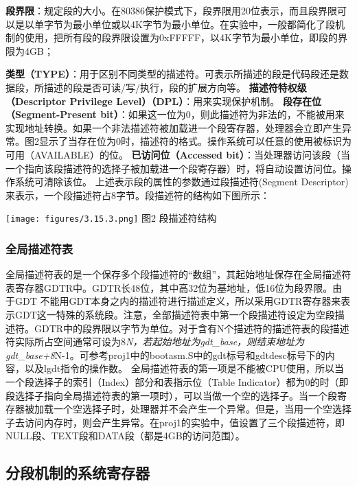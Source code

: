 \textbf{段界限}：规定段的大小。在80386保护模式下，段界限用20位表示，而且段界限可以是以单字节为最小单位或以4K字节为最小单位。在实验中，一般都简化了段机制的使用，把所有段的段界限设置为0xFFFFF，以4K字节为最小单位，即段的界限为4GB；

\textbf{类型（TYPE）}：用于区别不同类型的描述符。可表示所描述的段是代码段还是数据段，所描述的段是否可读/写/执行，段的扩展方向等。
\textbf{描述符特权级（Descriptor Privilege
Level）（DPL）}：用来实现保护机制。 \textbf{段存在位（Segment-Present
bit）}：如果这一位为0，则此描述符为非法的，不能被用来实现地址转换。如果一个非法描述符被加载进一个段寄存器，处理器会立即产生异常。图2显示了当存在位为0时，描述符的格式。操作系统可以任意的使用被标识为可用（AVAILABLE）的位。
\textbf{已访问位（Accessed
bit）}：当处理器访问该段（当一个指向该段描述符的选择子被加载进一个段寄存器）时，将自动设置访问位。操作系统可清除该位。
上述表示段的属性的参数通过段描述符(Segment
Descriptor)来表示，一个段描述符占8字节。段描述符的结构如下图所示：

\texttt{[image: figures/3.15.3.png]} 图2 段描述符结构

\subsubsection{全局描述符表}\label{ux5168ux5c40ux63cfux8ff0ux7b26ux8868}

全局描述符表的是一个保存多个段描述符的``数组''，其起始地址保存在全局描述符表寄存器GDTR中。GDTR长48位，其中高32位为基地址，低16位为段界限。由于GDT
不能用GDT本身之内的描述符进行描述定义，所以采用GDTR寄存器来表示GDT这一特殊的系统段。注意，全部描述符表中第一个段描述符设定为空段描述符。GDTR中的段界限以字节为单位。对于含有N个描述符的描述符表的段描述符实际所占空间通常可设为8\emph{N，若起始地址为gdt\_base，则结束地址为gdt\_base+8}N-1。可参考proj1中的bootasm.S中的gdt标号和gdtdesc标号下的内容，以及lgdt指令的操作数。
全局描述符表的第一项是不能被CPU使用，所以当一个段选择子的索引（Index）部分和表指示位（Table
Indicator）都为0的时（即段选择子指向全局描述符表的第一项时），可以当做一个空的选择子。当一个段寄存器被加载一个空选择子时，处理器并不会产生一个异常。但是，当用一个空选择子去访问内存时，则会产生异常。在proj1的实验中，值设置了三个段描述符，即NULL段、TEXT段和DATA段（都是4GB的访问范围）。

\subsection{分段机制的系统寄存器}\label{ux5206ux6bb5ux673aux5236ux7684ux7cfbux7edfux5bc4ux5b58ux5668}

